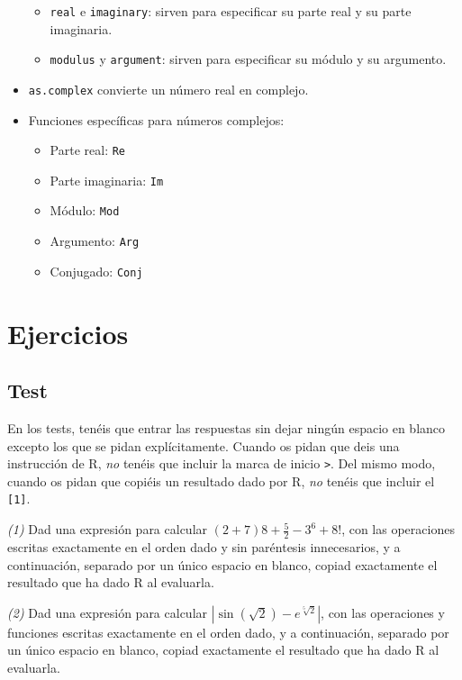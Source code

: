 \documentclass[]{book}
\providecommand{\tightlist}{%
  \setlength{\itemsep}{0pt}\setlength{\parskip}{0pt}}
\theoremstyle{definition}
\theoremstyle{definition}
\theoremstyle{definition}
\theoremstyle{remark}
\begin{document}
\begin{itemize}
  \begin{itemize}
  \tightlist
  \item
    \texttt{real} e \texttt{imaginary}: sirven para especificar su parte real y su parte imaginaria.
  \item
    \texttt{modulus} y \texttt{argument}: sirven para especificar su módulo y su argumento.
  \end{itemize}
\item
  \texttt{as.complex} convierte un número real en complejo.
\item
  Funciones específicas para números complejos:

  \begin{itemize}
  \tightlist
  \item
    Parte real: \texttt{Re}
  \item
    Parte imaginaria: \texttt{Im}
  \item
    Módulo: \texttt{Mod}
  \item
    Argumento: \texttt{Arg}
  \item
    Conjugado: \texttt{Conj}
  \end{itemize}
\end{itemize}

\hypertarget{ejercicios}{%
\section{Ejercicios}\label{ejercicios}}

\hypertarget{test}{%
\subsection*{Test}\label{test}}

En los tests, tenéis que entrar las respuestas sin dejar ningún espacio en blanco excepto los que se pidan explícitamente. Cuando os pidan que deis una instrucción de R, \emph{no} tenéis que incluir la marca de inicio \texttt{\textgreater{}}. Del mismo modo, cuando os pidan que copiéis un resultado dado por R, \emph{no} tenéis que incluir el \texttt{{[}1{]}}.

\emph{(1)} Dad una expresión para calcular \((2+7)8+\frac{5}{2}-3^6+8!\), con las operaciones escritas exactamente en el orden dado y sin paréntesis innecesarios, y a continuación, separado por un único espacio en blanco, copiad exactamente el resultado que ha dado R al evaluarla.

\emph{(2)} Dad una expresión para calcular \(|\sin(\sqrt{2})-e^{\sqrt[5]{2}}|\), con las operaciones y funciones escritas exactamente en el orden dado, y a continuación, separado por un único espacio en blanco, copiad exactamente el resultado que ha dado R al evaluarla.
\end{document}
